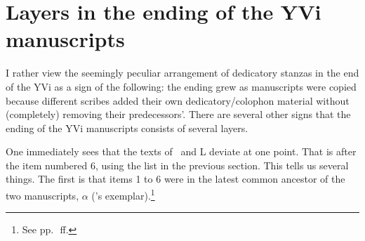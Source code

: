 \section{Layers in the ending of the YVi manuscripts}
I rather view the seemingly peculiar arrangement of dedicatory stanzas in the end of the YVi as a sign of the following: the ending grew as manuscripts were copied because different scribes added their own dedicatory/colophon material without (completely) removing their predecessors'. 
There are several other signs that the ending of the YVi manuscripts consists of several layers.



One immediately sees that the texts of \Tm\ and L deviate at one point. That is after the item numbered 6, using the list in the previous section. This tells us several things.
The first is that items 1 to 6 were in the latest common ancestor of the two manuscripts, $\alpha$ (\Tm's exemplar).\footnote{See pp.~\pageref{extmandl}\,ff.}

